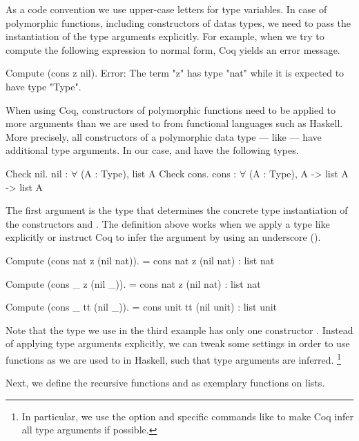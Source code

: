 As a code convention we use upper\--case letters for type variables.
In case of polymorphic functions, including constructors of datas types, we need to pass the instantiation of the type arguments explicitly.
For example, when we try to compute the following expression to normal form, Coq yields an error message.

\begin{crepl}
\coqrepl Compute (cons z nil).
Error: The term "z" has type "nat" while it is expected to have type
       "Type".
\end{crepl}

When using Coq, constructors of polymorphic functions need to be applied to more arguments than we are used to from functional languages such as Haskell.
More precisely, all constructors of a polymorphic data type --- like  --- have additional type arguments.
In our case,  and  have the following types.

\begin{crepl}
\coqrepl Check nil.
   nil : \(\forall\) (A : Type), list A
\coqrepl Check cons.
   cons : \(\forall\) (A : Type), A -> list A -> list A
\end{crepl}

The first argument is the type that determines the concrete type instantiation of the constructors  and .
The definition above works when we apply a type like  explicitly or instruct Coq to infer the argument by using an underscore (\cinl{_}).

\begin{crepl}
\coqrepl Compute (cons nat z (nil nat)).
    = cons nat z (nil nat)
    : list nat

\coqrepl Compute (cons _ z (nil _)).
    = cons nat z (nil nat)
    : list nat

\coqrepl Compute (cons _ tt (nil _)).
    = cons unit tt (nil unit)
    : list unit
\end{crepl}

Note that the type  we use in the third example has only one constructor .
Instead of applying type arguments explicitly, we can tweak some settings in order to use functions as we are used to in Haskell, such that type arguments are inferred. \footnote{In particular, we use the option  and specific commands like  to make Coq infer all type arguments if possible.}

Next, we define the recursive functions  and  as exemplary functions on lists.


